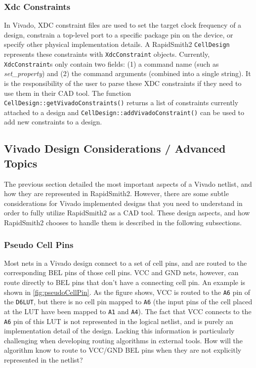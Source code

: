 \subsubsection{Xdc Constraints}
In Vivado, XDC constraint files are used to set the target clock frequency of a
design, constrain a top-level port to a specific package pin on the device, or
specify other physical implementation details. A RapidSmith2 \texttt{CellDesign}
represents these constraints with \texttt{XdcConstraint} objects. Currently,
\texttt{XdcConstraint}s only contain two fields: (1) a command name
(such as \textit{set\_property}) and (2) the command arguments (combined into a
single string). It is the responsibility of the user to parse these XDC
constraints if they need to use them in their CAD tool. The function
\texttt{CellDesign::getVivadoConstraints()} returns a list of constraints
currently attached to a design and \texttt{CellDesign::addVivadoConstraint()}
can be used to add new constraints to a design.

\subsection{Vivado Design Considerations / Advanced Topics}
The previous section detailed the most important aspects of a Vivado 
netlist, and how they are represented in RapidSmith2. However, there are some
subtle considerations for Vivado implemented designs that you need to
understand in order to fully utilize RapidSmith2 as a CAD tool. These design
aspects, and how RapidSmith2 chooses to handle them is described in the
following subsections.

\subsubsection{Pseudo Cell Pins} \label{sec:pseudoCellPin}
Most nets in a Vivado design connect to a set of cell pins, and are routed to
the corresponding BEL pins of those cell pins. VCC and GND nets,
however, can route directly to BEL pins that don't have a connecting cell pin.
An example is shown in \autoref{fig:pseudoCellPin}. As the figure shows, VCC is
routed to the \texttt{A6} pin of the \texttt{D6LUT}, but there is no cell pin
mapped to \texttt{A6} (the input pins of the cell placed at the LUT have
been mapped to \texttt{A1} and \texttt{A4}). The fact that VCC connects to the
\texttt{A6} pin of this LUT is not represented in the logical netlist, and is purely an
implementation detail of the design. Lacking this information is particularly
challenging when developing routing algorithms in external tools. How will the
algorithm know to route to VCC/GND BEL pins when they are not explicitly
represented in the netlist?

